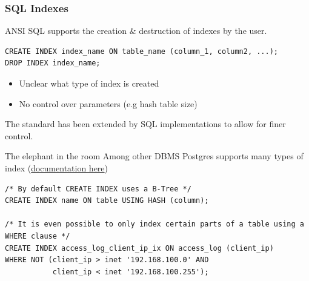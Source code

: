 \subsubsection{SQL Indexes}
ANSI SQL supports the creation \& destruction of indexes by the user.
\begin{verbatim}
CREATE INDEX index_name ON table_name (column_1, column2, ...);
DROP INDEX index_name;
\end{verbatim}
\begin{itemize}
    \item Unclear what type of index is created
    \item No control over parameters (e.g hash table size)
\end{itemize}
The standard has been extended by SQL implementations to allow for finer control.
\begin{sidenotebox}{The elephant in the room}
    Among other DBMS Postgres supports many types of index (\href{https://www.postgresql.org/docs/current/indexes.html}{documentation here})
    \begin{verbatim}
/* By default CREATE INDEX uses a B-Tree */
CREATE INDEX name ON table USING HASH (column);

/* It is even possible to only index certain parts of a table using a WHERE clause */
CREATE INDEX access_log_client_ip_ix ON access_log (client_ip)
WHERE NOT (client_ip > inet '192.168.100.0' AND
           client_ip < inet '192.168.100.255');
    \end{verbatim}
\end{sidenotebox}

